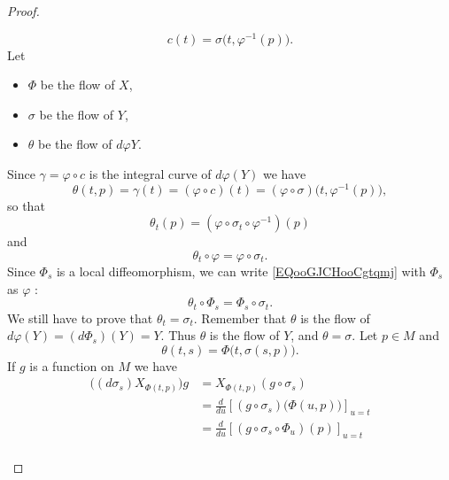 \begin{proof}
\begin{subproof}
		\begin{equation}
			c(t)=\sigma\big( t,\varphi^{-1}(p) \big).
		\end{equation}
		Let
		\begin{itemize}
			\item \( \Phi\) be the flow of \( X\),
			\item \( \sigma\) be the flow of \( Y\),
			\item \( \theta\) be the flow of \( d\varphi Y\).
		\end{itemize}
		Since \( \gamma=\varphi\circ c\) is the integral curve of \( d\varphi(Y)\) we have
		\begin{equation}
			\theta(t,p)=\gamma(t)=(\varphi\circ c)(t)=(\varphi\circ\sigma)\big( t,\varphi^{-1}(p) \big),
		\end{equation}
		so that
		\begin{equation}
			\theta_t(p)=(\varphi\circ\sigma_t\circ\varphi^{-1})(p)
		\end{equation}
		and
		\begin{equation}		\label{EQooGJCHooCgtqmj}
			\theta_t\circ\varphi=\varphi\circ\sigma_t.
		\end{equation}
		Since \( \Phi_s\) is a local diffeomorphism, we can write \eqref{EQooGJCHooCgtqmj} with \( \Phi_s\) as \( \varphi\) :
		\begin{equation}
			\theta_t\circ\Phi_s=\Phi_s\circ \sigma_t.
		\end{equation}
		We still have to prove that \( \theta_t=\sigma_t\). Remember that \( \theta\) is the flow of \( d\varphi(Y)=(d\Phi_s)(Y)=Y\). Thus \( \theta\) is the flow of \( Y\), and \( \theta=\sigma\).
		\spitem[\ref{ITEMooZIRJooFNogYn} \( \Rightarrow\) \ref{ITEMooMOCPooTlYzil}]
		Let \( p\in M\) and
		\begin{equation}
			\theta(t,s)=\Phi\big( t,\sigma(s,p) \big).
		\end{equation}
		If \( g\) is a function on \( M\) we have
		\begin{subequations}
			\begin{align}
				\big( (d\sigma_s)X_{\Phi(t,p)} \big)g & =X_{\Phi(t,p)}(g\circ \sigma_s)                                                          \\
				                                      & =\frac{d}{du} \left[   (g\circ\sigma_s)\big( \Phi(u,p) \big) \right]_{u=t}               \\
				                                      & =\frac{d}{du} \left[ (g\circ\sigma_s\circ\Phi_u)(p)  \right]_{u=t}                       \\

\end{align}
\end{subequations}
\end{subproof}
\end{proof}
